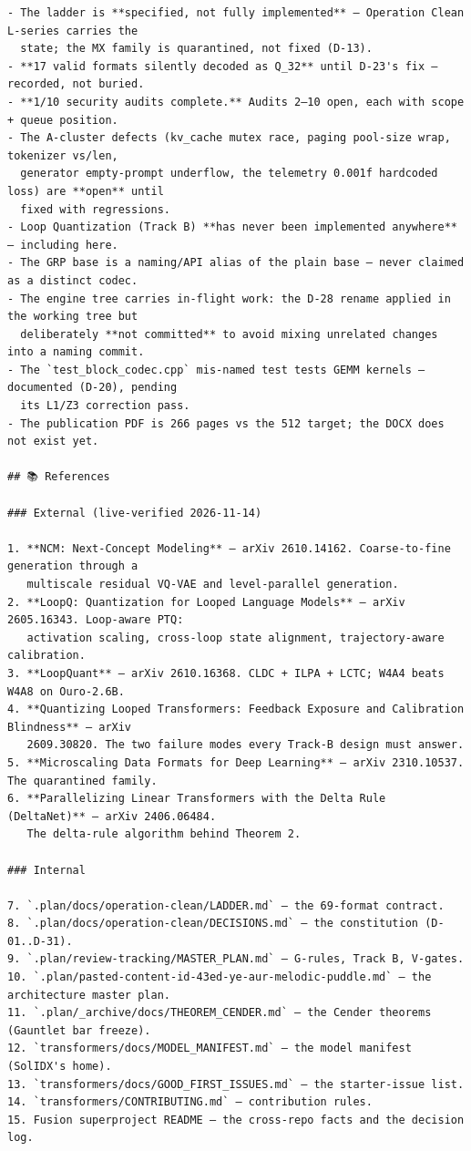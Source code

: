 \begin{Verbatim}[breaklines,breakanywhere,fontsize=\footnotesize]
- The ladder is **specified, not fully implemented** — Operation Clean L-series carries the
  state; the MX family is quarantined, not fixed (D-13).
- **17 valid formats silently decoded as Q_32** until D-23's fix — recorded, not buried.
- **1/10 security audits complete.** Audits 2–10 open, each with scope + queue position.
- The A-cluster defects (kv_cache mutex race, paging pool-size wrap, tokenizer vs/len,
  generator empty-prompt underflow, the telemetry 0.001f hardcoded loss) are **open** until
  fixed with regressions.
- Loop Quantization (Track B) **has never been implemented anywhere** — including here.
- The GRP base is a naming/API alias of the plain base — never claimed as a distinct codec.
- The engine tree carries in-flight work: the D-28 rename applied in the working tree but
  deliberately **not committed** to avoid mixing unrelated changes into a naming commit.
- The `test_block_codec.cpp` mis-named test tests GEMM kernels — documented (D-20), pending
  its L1/Z3 correction pass.
- The publication PDF is 266 pages vs the 512 target; the DOCX does not exist yet.

## 📚 References

### External (live-verified 2026-11-14)

1. **NCM: Next-Concept Modeling** — arXiv 2610.14162. Coarse-to-fine generation through a
   multiscale residual VQ-VAE and level-parallel generation.
2. **LoopQ: Quantization for Looped Language Models** — arXiv 2605.16343. Loop-aware PTQ:
   activation scaling, cross-loop state alignment, trajectory-aware calibration.
3. **LoopQuant** — arXiv 2610.16368. CLDC + ILPA + LCTC; W4A4 beats W4A8 on Ouro-2.6B.
4. **Quantizing Looped Transformers: Feedback Exposure and Calibration Blindness** — arXiv
   2609.30820. The two failure modes every Track-B design must answer.
5. **Microscaling Data Formats for Deep Learning** — arXiv 2310.10537. The quarantined family.
6. **Parallelizing Linear Transformers with the Delta Rule (DeltaNet)** — arXiv 2406.06484.
   The delta-rule algorithm behind Theorem 2.

### Internal

7. `.plan/docs/operation-clean/LADDER.md` — the 69-format contract.
8. `.plan/docs/operation-clean/DECISIONS.md` — the constitution (D-01..D-31).
9. `.plan/review-tracking/MASTER_PLAN.md` — G-rules, Track B, V-gates.
10. `.plan/pasted-content-id-43ed-ye-aur-melodic-puddle.md` — the architecture master plan.
11. `.plan/_archive/docs/THEOREM_CENDER.md` — the Cender theorems (Gauntlet bar freeze).
12. `transformers/docs/MODEL_MANIFEST.md` — the model manifest (SolIDX's home).
13. `transformers/docs/GOOD_FIRST_ISSUES.md` — the starter-issue list.
14. `transformers/CONTRIBUTING.md` — contribution rules.
15. Fusion superproject README — the cross-repo facts and the decision log.


\end{Verbatim}
